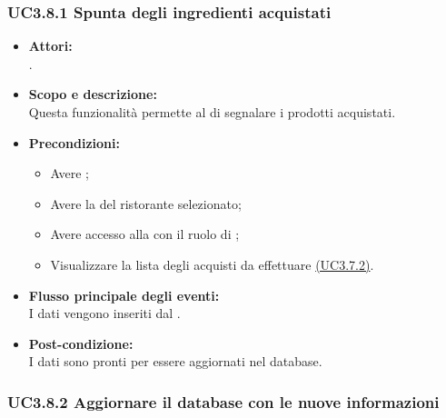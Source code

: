 \subsubsection{UC3.8.1 Spunta degli ingredienti acquistati} \label{UC3.8.1}

\begin{itemize}
	\item \textbf{Attori:}
	\\.
	\item \textbf{Scopo e descrizione:} 
	\\Questa funzionalità permette al  di segnalare i prodotti acquistati.
	\item \textbf{Precondizioni:}
	\begin{itemize}
		\item Avere ;
		\item Avere la  del ristorante selezionato;
		\item Avere accesso alla  con il ruolo di ;
		\item Visualizzare la lista degli acquisti da effettuare \hyperref[UC3.7.2]{(UC3.7.2)}.
	\end{itemize}
	\item \textbf{Flusso principale degli eventi:}
	\\I dati vengono inseriti dal .
	\item \textbf{Post-condizione:}
	\\I dati sono pronti per essere aggiornati nel database.
\end{itemize}

\subsubsection{UC3.8.2 Aggiornare il database con le nuove informazioni} \label{UC3.8.2}


